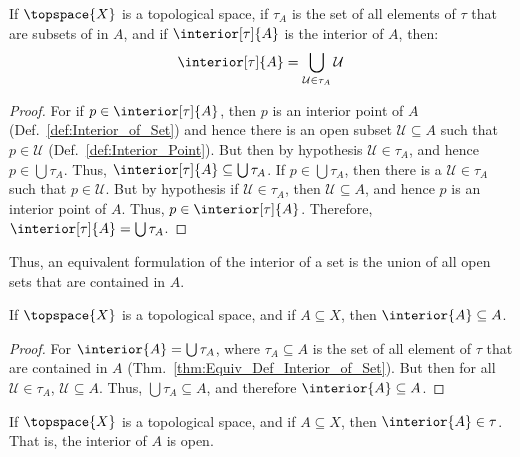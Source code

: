 \documentclass{article}                                                        %
\begin{document}
        \begin{theorem}
            \label{thm:Equiv_Def_Interior_of_Set}%
            If $\topspace{X}$ is a topological space, if
            $\tau_{A}$ is the set of all elements of $\tau$ that are subsets of
            in $A$, and if $\interior[\tau]{A}$ is the interior of $A$, then:
            \begin{equation}
                \interior[\tau]{A}=
                    \bigcup_{\mathcal{U}\in\tau_{A}}\mathcal{U}
            \end{equation}
        \end{theorem}
        \begin{proof}
            For if $p\in\interior[\tau]{A}$, then $p$ is an interior point of
            $A$ (Def.~\ref{def:Interior_of_Set}) and hence there is an open
            subset $\mathcal{U}\subseteq{A}$ such that $p\in\mathcal{U}$
            (Def.~\ref{def:Interior_Point}). But then by hypothesis
            $\mathcal{U}\in\tau_{A}$, and hence $p\in\bigcup\tau_{A}$. Thus,
            $\interior[\tau]{A}\subseteq\bigcup\tau_{A}$. If
            $p\in\bigcup\tau_{A}$, then there is a $\mathcal{U}\in\tau_{A}$
            such that $p\in\mathcal{U}$. But by hypothesis if
            $\mathcal{U}\in\tau_{A}$, then $\mathcal{U}\subseteq{A}$, and hence
            $p$ is an interior point of $A$. Thus, $p\in\interior[\tau]{A}$.
            Therefore, $\interior[\tau]{A}=\bigcup\tau_{A}$.
        \end{proof}
        Thus, an equivalent formulation of the interior of a set is the union
        of all open sets that are contained in $A$.
        \begin{theorem}
            \label{thm:Interior_is_Smaller}%
            If $\topspace{X}$ is a topological space, and if $A\subseteq{X}$,
            then $\interior{A}\subseteq{A}$.
        \end{theorem}
        \begin{proof}
            For $\interior{A}=\bigcup\tau_{A}$, where $\tau_{A}\subseteq{A}$ is
            the set of all element of $\tau$ that are contained in $A$
            (Thm.~\ref{thm:Equiv_Def_Interior_of_Set}). But then for all
            $\mathcal{U}\in\tau_{A}$, $\mathcal{U}\subseteq{A}$. Thus,
            $\bigcup\tau_{A}\subseteq{A}$, and therefore
            $\interior{A}\subseteq{A}$.
        \end{proof}
        \begin{theorem}
            \label{thm:Interior_is_Open}%
            If $\topspace{X}$ is a topological space, and if $A\subseteq{X}$,
            then $\interior{A}\in\tau$. That is, the interior of $A$ is open.
        \end{theorem}
\end{document}
